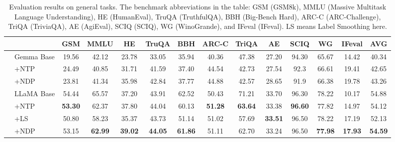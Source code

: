 \documentclass{article}
\begin{document}
\begin{table}[htbp]
\small
 \centering
\begin{tabular}{l l | c c c c c c c c c c c | c}
\toprule
& & GSM & MMLU & HE &  TruQA & BBH & ARC-C & TriQA  &AE & SCIQ & WG & IFeval & AVG \\
\midrule
& Gemma Base & 19.56 & 42.12 & 23.78 & 33.05 & 35.94 & 40.36 & 47.38 & 27.20 & 94.30 & 65.67 & 14.42 & 40.34 \\
& +NTP & 24.49 & 40.85 & 31.71 & 41.59 & 37.40 & 44.54 & 42.73 & 27.54 & 92.3 & 66.61 & 19.41 & 42.65 \\
& +NDP & 23.81 & 41.34 & 35.98 & 42.84 & 37.77 & 44.88 & 42.57 & 28.65 & 91.9 & 66.38 & 19.78 & 43.26 \\
\midrule
\midrule
& LLaMA Base & 54.44 & 65.57 & 37.20 & 43.91 & 62.52 & 50.43 & 71.21 & 33.70 & 96.30 & 78.22 & 10.17 & 54.88 \\
& +NTP & \textbf{53.30} & 62.37 & 37.80 & 44.04 & 60.13 & \textbf{51.28} & \textbf{63.64} & 33.38 & \textbf{96.60} & 77.82 & 14.97 & 54.12 \\
& +LS & 50.80 & 58.23 & 35.37 & 43.73 & 51.14 & 51.02 & 57.69 & \textbf{33.51} & 96.50 & 78.22 & 17.19 & 52.13 \\
& +NDP & 53.15 & \textbf{62.99} & \textbf{39.02} & \textbf{44.05} & \textbf{61.86} & 51.11 & 62.70 & 33.24 & 96.50 & \textbf{77.98} & \textbf{17.93} & \textbf{54.59} \\

\bottomrule
\end{tabular}
\caption{Evaluation results on general tasks. The benchmark abbreviations in the table: GSM (GSM8k), MMLU (Massive Multitask Language Understanding), HE (HumanEval), TruQA (TruthfulQA), BBH (Big-Bench Hard), ARC-C (ARC-Challenge), TriQA (TriviaQA), AE (AgiEval), SCIQ (SCIQ), WG (WinoGrande), and IFeval (IFeval). LS means Label Smoothing here.}
\label{tab:performance}
\end{table}
\end{document}
